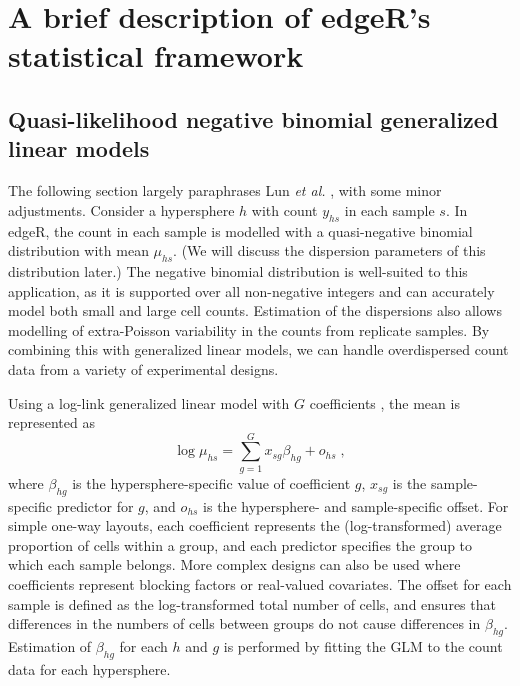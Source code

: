 \documentclass{article}
\begin{document}
\section{A brief description of edgeR's statistical framework}

\subsection{Quasi-likelihood negative binomial generalized linear models}
The following section largely paraphrases Lun \textit{et al.} \cite{lun2016delicious}, with some minor adjustments.
Consider a hypersphere $h$ with count $y_{hs}$ in each sample $s$.
In edgeR, the count in each sample is modelled with a quasi-negative binomial distribution with mean $\mu_{hs}$.
(We will discuss the dispersion parameters of this distribution later.)
The negative binomial distribution is well-suited to this application, as it is supported over all non-negative integers and can accurately model both small and large cell counts.
Estimation of the dispersions also allows modelling of extra-Poisson variability in the counts from replicate samples.
By combining this with generalized linear models, we can handle overdispersed count data from a variety of experimental designs.

Using a log-link generalized linear model with $G$ coefficients \cite{mccarthy2012differential}, the mean is represented as
\[
    \log \mu_{hs} = \sum_{g=1}^G x_{sg} \beta_{hg} + o_{hs} \;,
\]
where $\beta_{hg}$ is the hypersphere-specific value of coefficient $g$, $x_{sg}$ is the sample-specific predictor for $g$, and $o_{hs}$ is the hypersphere- and sample-specific offset.
For simple one-way layouts, each coefficient represents the (log-transformed) average proportion of cells within a group, and each predictor specifies the group to which each sample belongs.
More complex designs can also be used where coefficients represent blocking factors or real-valued covariates.
The offset for each sample is defined as the log-transformed total number of cells, and ensures that differences in the numbers of cells between groups do not cause differences in $\beta_{hg}$.
Estimation of $\beta_{hg}$ for each $h$ and $g$ is performed by fitting the GLM to the count data for each hypersphere.
\end{document}
